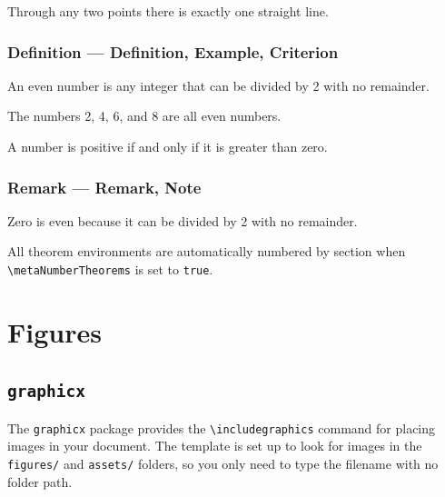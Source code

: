 		\begin{axiom}
			\label{axm:line}
			Through any two points there is exactly one straight line.
		\end{axiom}
		
		\subsubsection{Definition --- Definition, Example, Criterion}
		
		\begin{definition}
			\label{def:even}
			An even number is any integer that can be divided by 2 with no remainder.
		\end{definition}
		
		\begin{example}
			\label{ex:even}
			The numbers 2, 4, 6, and 8 are all even numbers.
		\end{example}
		
		\begin{criterion}
			\label{crit:positive}
			A number is positive if and only if it is greater than zero.
		\end{criterion}
		
		\subsubsection{Remark --- Remark, Note}
		
		\begin{remark}
			\label{rem:zero}
			Zero is even because it can be divided by 2 with no remainder.
		\end{remark}
		
		\begin{note}
			\label{note:numbering}
			All theorem environments are automatically numbered by section when \texttt{\textbackslash metaNumberTheorems} is set to \texttt{true}.
		\end{note}

\section{Figures}

	\subsection{\texttt{graphicx}}
	The \texttt{graphicx} package provides the \texttt{\textbackslash includegraphics} command for placing images in your document. The template is set up to look for images in the \texttt{figures/} and \texttt{assets/} folders, so you only need to type the filename with no folder path.
	
